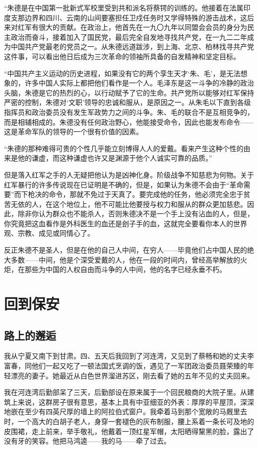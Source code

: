 \documentclass[10pt]{book}
\begin{document}
“朱德是在中国第一批新式军校里受到共和派名将蔡锷的训练的。他接着在法属印度支那边界和四川、云南的山间要塞担任卫戍任务时又学得特殊的游击战术，这后来对红军有很大的贡献。在政治上，他首先在一九〇九年以同盟会会员的身分为民主政治而奋斗，接着加入了国民党，最后完全自发地寻找共产党，在一九二二年成为中国共产党最老的党员之一。从朱德远道跋涉，到上海、北京、柏林找寻共产党这件事，可以看出他日后成为三次革命的领袖所具备的自发精神和坚定目标。

“中国共产主义运动的历史进程，如果没有它的两个孪生天才‘朱、毛’，是无法想象的，许多中国人实际上都把他们看作是一个人。毛泽东是这一斗争的冷静的政治头脑，朱德是它的热烈的心，以行动赋予了它的生命。共产党所以能够对红军保持严密的控制，朱德对‘文职’领导的忠诚和服从，是原因之一。从朱毛以下直到各级指挥员和政治委员没有发生军政势力之间的斗争。朱、毛的联合不是互相竞争的，而是相辅相成的。朱德没有任何政治野心，他能接受命令，因此也能发布命令——这是革命军队的领导的一个很有价值的因素。

“朱德的那种难得可贵的个性几乎能立刻博得人人的爱戴。看来产生这种个性的由来是他的谦虚，而这种谦虚也许又是渊源于他个人诚实可靠的品质。”

但是落入红军之手的人无疑把他认为是凶神化身。阶级战争不知慈悲为何物。关于红军暴行的许多传说现在已证明是不确的，但是，如果认为朱德不会由于“革命需要”而下枪决的命令，那就不免过于天真了。要完成他的任务，他必须完全忠于贫苦无依的人，在这个地位上，他不可能比他要授与权力和服从的群众更加慈悲。因此，除非你认为群众也不能杀人，否则朱德决不是一个手上没有沾血的人，但是，你究竟把这血看作是外科医生的血还是刽子手的血，这就完全要看你本人的世界观、宗教、成见或同情心了。

反正朱德不是圣人，但是在他的自己人中间，在穷人——毕竟他们占中国人民的绝大多数——中间，他是个深受爱戴的人，他在一段的时间内，曾经高举解放的火炬，在那些为中国的人权自由而斗争的人中间，他的名字已经永垂不朽。

\chapter{回到保安}

\section{路上的邂逅}

我从宁夏又南下到甘肃。四、五天后我回到了河连湾，又见到了蔡畅和她的丈夫李富春，同他们一起又吃了一顿法国式烹调的饭，遇见了一军团政治委员聂荣臻的年轻漂亮的妻子。她最近从白色世界溜进苏区，刚去看了她的五年不见的丈夫回来。

我在河连湾后勤部呆了三天，后勤部设在原来属于一个回民粮商的大院子里。从建筑上来说，这群房子很有意思，基本上具有中亚细亚的外表：厚厚的平屋顶，深深地嵌在至少有四英尺厚的墙上的阿拉伯式窗户。我牵着马到那个宽敞的马厩里去时，一个高大的白胡子老人，身穿一套褪色的灰布制服，腰上系着一条长可及地的皮围裙，走上前来，举手敬礼，他戴着一顶红星军帽，太阳晒得黧黑的脸，露出了没有牙的笑容。他把马鸿逵——我的马——牵了过去。
\end{document}
